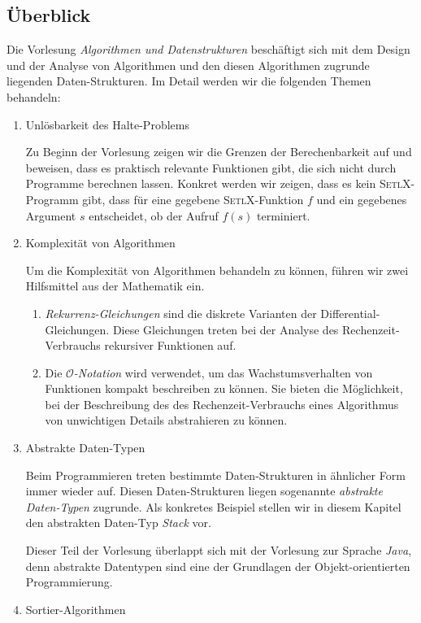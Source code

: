 \subsection{\"Uberblick}
Die Vorlesung \emph{Algorithmen und Datenstrukturen} besch\"aftigt sich mit dem Design und
der Analyse von Algorithmen und den diesen Algorithmen zugrunde liegenden
Daten-Strukturen.  Im Detail werden wir die folgenden Themen behandeln:
\begin{enumerate}
\item Unl\"osbarkeit des Halte-Problems

      Zu Beginn der Vorlesung zeigen wir die Grenzen der Berechenbarkeit auf
      und beweisen, dass es praktisch relevante Funktionen gibt, die sich nicht durch
      Programme berechnen lassen.  Konkret werden wir zeigen, dass es kein \textsc{SetlX}-Programm
      gibt, dass f\"ur eine gegebene \textsc{SetlX}-Funktion $f$ und ein gegebenes Argument
      $s$ entscheidet, ob der Aufruf $f(s)$ terminiert.
\item Komplexit\"at von Algorithmen

      Um die Komplexit\"at von Algorithmen behandeln zu k\"onnen, f\"uhren wir zwei
      Hilfsmittel aus der Mathematik ein.
      \begin{enumerate}
      \item \emph{Rekurrenz-Gleichungen} sind die diskrete Varianten der
            Differential-Gleichungen.  Diese Gleichungen treten bei der Analyse
            des Rechenzeit-Verbrauchs rekursiver Funktionen auf.
      \item Die \emph{$\mathcal{O}$-Notation} wird verwendet, um das Wachstumsverhalten 
            von Funktionen kompakt beschreiben zu k\"onnen.  Sie bieten die M\"oglichkeit,
            bei der Beschreibung des des Rechenzeit-Verbrauchs eines Algorithmus von
            unwichtigen Details abstrahieren zu k\"onnen. 
      \end{enumerate}
\item Abstrakte Daten-Typen

      Beim Programmieren treten bestimmte Daten-Strukturen in \"ahnlicher Form
      immer wieder auf.  Diesen Daten-Strukturen liegen sogenannte
      \emph{abstrakte Daten-Typen} zugrunde.  Als konkretes Beispiel
      stellen wir in diesem Kapitel den abstrakten Daten-Typ \textsl{Stack} vor.

      Dieser Teil der Vorlesung \"uberlappt sich mit der Vorlesung zur Sprache \textsl{Java}, 
      denn abstrakte Datentypen sind eine der Grundlagen der Objekt-orientierten Programmierung.
\item Sortier-Algorithmen


\end{enumerate}
